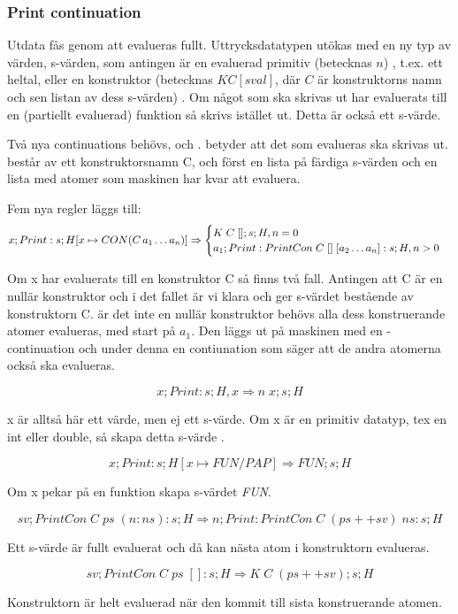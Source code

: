\documentclass[../Core]{subfiles}
\begin{document}
\subsubsection{Print continuation}
Utdata fås genom att  evalueras fullt. %
Uttrycksdatatypen utökas med en ny typ av värden, 
s-värden, som antingen är en evaluerad primitiv (betecknas $n$)
, t.ex. ett heltal, eller en konstruktor (betecknas $K C [sval]$, där
$C$ är konstruktorns namn och sen listan av dess s-värden) .
Om något som ska skrivas ut har evaluerats till en (partiellt evaluerad)
funktion så skrivs  istället ut. Detta är också ett s-värde.





Två nya continuations behövs,  och .
 betyder att det som evalueras ska skrivas ut.  består av ett
konstruktorsnamn C, och först en lista på färdiga s-värden och en lista med
atomer som maskinen har kvar att evaluera.

Fem nya regler läggs till:
\[
x ; Print : s ; H[x \mapsto CON(C\,a_1 \ldots a_n)]
\Rightarrow \begin{cases} 
K \; C \; [] ; s ; H , n = 0 \\
a_1 ; Print : PrintCon \; C \; [] \; [a_2 \ldots a_n] : s ; H , n > 0
\end{cases}
\]

Om x har evaluerats till en konstruktor C så finns två fall. Antingen att C är
en nullär konstruktor och i det fallet är vi klara och ger s-värdet bestående
av konstruktorn C.
    är det inte en nullär konstruktor behövs alla dess konstruerande atomer
evalueras, med start på $a_1$. Den läggs ut på maskinen med en -continuation
och under denna en contiunation som säger att de andra atomerna också ska
evalueras.
 

\[
x ; Print : s ; H , x
\Rightarrow n \; x ; s ; H
\]

x är alltså här ett värde, men ej ett s-värde.
Om x är en primitiv datatyp, tex en int eller double, så skapa detta s-värde
.


\[
x ; Print : s ; H[x \mapsto FUN / PAP]
\Rightarrow FUN ; s ; H
\]

Om x pekar på en funktion skapa s-värdet \emph{FUN}.


\[
sv ; PrintCon \; C \; ps \; (n : ns) : s ; H
\Rightarrow n ; Print : PrintCon \; C \; (ps ++ sv) \; ns : s ; H
\]


Ett s-värde är fullt evaluerat och då kan nästa atom i konstruktorn evalueras. 


\[
sv ; PrintCon \; C \; ps \; [] : s ; H
\Rightarrow K \; C \; (ps ++ sv) ; s ; H
\]

Konstruktorn är helt evaluerad när den kommit till sista konstruerande atomen.
\end{document}
